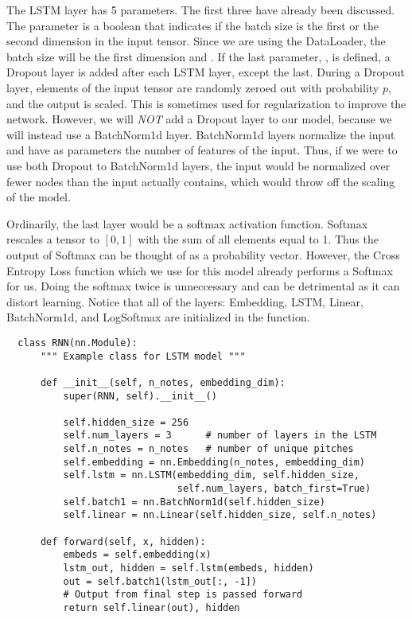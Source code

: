 The LSTM layer has 5 parameters.
The first three have already been discussed.
The parameter  is a boolean that indicates if the batch size is the first or the second dimension in the input tensor.
Since we are using the DataLoader, the batch size will be the first dimension and .
If the last parameter, , is defined, a Dropout layer is added after each LSTM layer, except the last.
During a Dropout layer, elements of the input tensor are randomly zeroed out with probability $p$, and the output is scaled.
This is sometimes used for regularization to improve the network.
However, we will \emph{NOT} add a Dropout layer to our model, because we will instead use a BatchNorm1d layer.
BatchNorm1d layers normalize the input and have as parameters the number of features of the input.
Thus, if we were to use both Dropout to BatchNorm1d layers, the input would be normalized over fewer nodes than the input actually contains, which would throw off the scaling of the model.

Ordinarily, the last layer would be a softmax activation function.
Softmax rescales a tensor to $[0,1]$ with the sum of all elements equal to 1.
Thus the output of Softmax can be thought of as a probability vector.
However, the Cross Entropy Loss function which we use for this model already performs a Softmax for us. 
Doing the softmax twice is unneccessary and can be detrimental as it can distort learning.
Notice that all of the layers: Embedding, LSTM, Linear, BatchNorm1d, and LogSoftmax are initialized in the  function.

\begin{lstlisting}
  class RNN(nn.Module):
      """ Example class for LSTM model """

      def __init__(self, n_notes, embedding_dim):
          super(RNN, self).__init__()

          self.hidden_size = 256
          self.num_layers = 3      # number of layers in the LSTM
          self.n_notes = n_notes   # number of unique pitches
          self.embedding = nn.Embedding(n_notes, embedding_dim)
          self.lstm = nn.LSTM(embedding_dim, self.hidden_size,
                              self.num_layers, batch_first=True)
          self.batch1 = nn.BatchNorm1d(self.hidden_size)
          self.linear = nn.Linear(self.hidden_size, self.n_notes)

      def forward(self, x, hidden):
          embeds = self.embedding(x)
          lstm_out, hidden = self.lstm(embeds, hidden)
          out = self.batch1(lstm_out[:, -1])
          # Output from final step is passed forward
          return self.linear(out), hidden

  \end{lstlisting}

